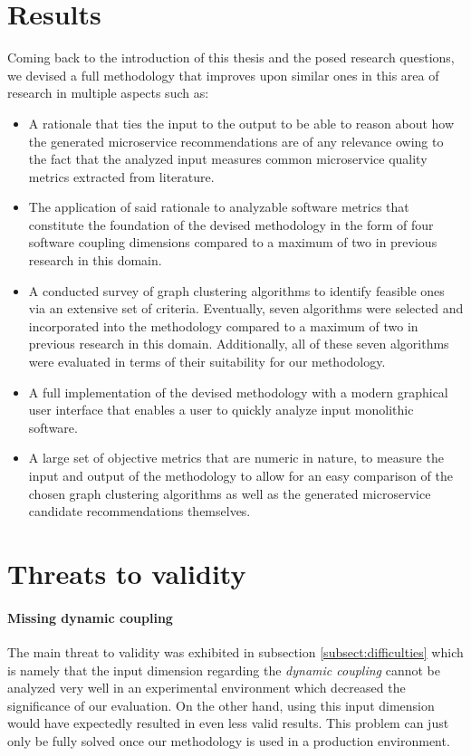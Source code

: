 \documentclass[12pt,a4paper]{report}
\begin{document}
\section{Results}

Coming back to the introduction of this thesis and the posed research questions,
we devised a full methodology that improves upon similar ones in
this area of research in multiple aspects such as:

\begin{itemize}
    \item A rationale that ties the input to the output to be able to reason
    about how the generated microservice recommendations are of any relevance
    owing to the fact that the analyzed input measures common microservice
    quality metrics extracted from literature.
    \item The application of said rationale to analyzable software metrics
    that constitute the foundation of the devised methodology in the form
    of four software coupling dimensions compared to a maximum
    of two in previous research in this domain.
    \item A conducted survey of graph clustering algorithms to identify feasible
    ones via an extensive set of criteria. Eventually, seven algorithms were
    selected and incorporated into the methodology compared to a maximum
    of two in previous research in this domain. Additionally, all of these seven
    algorithms were evaluated in terms of their suitability for our methodology.
    \item A full implementation of the devised methodology with a modern
    graphical user interface that enables a user to quickly analyze input
    monolithic software.
    \item A large set of objective metrics that are numeric in nature,
    to measure the input and output of the methodology to allow for an
    easy comparison of the chosen graph clustering algorithms as well as
    the generated microservice candidate recommendations themselves.
\end{itemize}



\section{Threats to validity} \label{sect:threats-to-validity}

\paragraph{Missing dynamic coupling}
The main threat to validity was exhibited in subsection \ref{subsect:difficulties}
which is namely that the input dimension regarding the \textit{dynamic coupling}
cannot be analyzed very well in an experimental environment which decreased
the significance of our evaluation. On the other hand, using this input dimension
would have expectedly resulted in even less valid results. This problem can just
only be fully solved once our methodology is used in a production environment.
\end{document}
